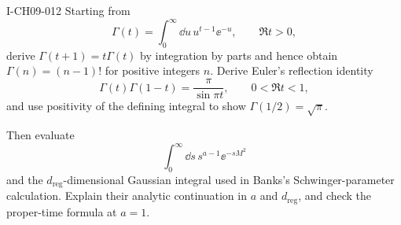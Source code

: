 \begin{exercise}{I-CH09-012}
Starting from
\[
  \Gamma(t)=\int_0^\infty\dd u\,u^{t-1}\ee^{-u},
  \qquad \Re t>0,
\]
derive $\Gamma(t+1)=t\Gamma(t)$ by integration by parts and hence obtain
$\Gamma(n)=(n-1)!$ for positive integers $n$.  Derive Euler's reflection
identity
\[
  \Gamma(t)\Gamma(1-t)=\frac{\pi}{\sin\pi t},
  \qquad 0<\Re t<1,
\]
and use positivity of the defining integral to show
$\Gamma(1/2)=\sqrt\pi$.

Then evaluate
\[
  \int_0^\infty\dd s\,s^{a-1}\ee^{-sM^2}
\]
and the $d_{\mathrm{reg}}$-dimensional Gaussian integral used in Banks's Schwinger-parameter
calculation.  Explain their analytic continuation in $a$ and $d_{\mathrm{reg}}$, and check
the proper-time formula at $a=1$.
\end{exercise}
